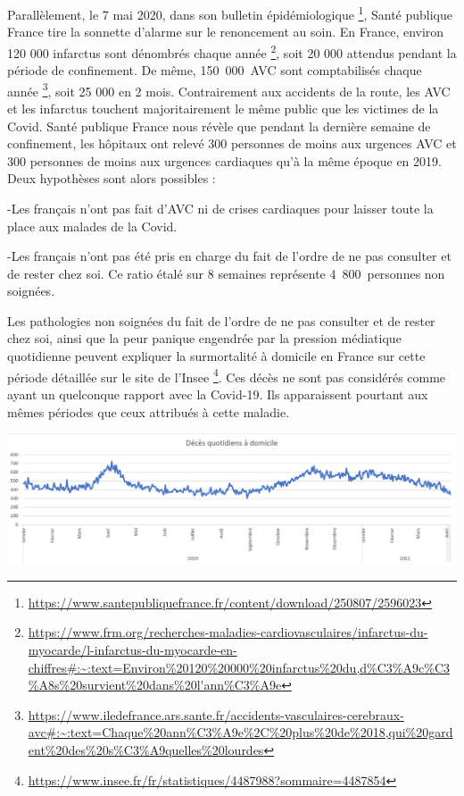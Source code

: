 \documentclass[
]{article}
\begin{document}
Parallèlement, le 7 mai 2020, dans son bulletin épidémiologique
\footnote{\url{https://www.santepubliquefrance.fr/content/download/250807/2596023}},
Santé publique France tire la sonnette d'alarme sur le renoncement au
soin. En France, environ 120 000 infarctus sont dénombrés chaque année
\footnote{\url{https://www.frm.org/recherches-maladies-cardiovasculaires/infarctus-du-myocarde/l-infarctus-du-myocarde-en-chiffres\#:~:text=Environ\%20120\%20000\%20infarctus\%20du,d\%C3\%A9c\%C3\%A8s\%20survient\%20dans\%20l'ann\%C3\%A9e}},
soit 20 000 attendus pendant la période de confinement. De même,
150~000~AVC sont comptabilisés chaque année \footnote{\url{https://www.iledefrance.ars.sante.fr/accidents-vasculaires-cerebraux-avc\#:~:text=Chaque\%20ann\%C3\%A9e\%2C\%20plus\%20de\%2018,qui\%20gardent\%20des\%20s\%C3\%A9quelles\%20lourdes}},
soit 25 000 en 2 mois. Contrairement aux accidents de la route, les AVC
et les infarctus touchent majoritairement le même public que les
victimes de la Covid. Santé publique France nous révèle que pendant la
dernière semaine de confinement, les hôpitaux ont relevé 300 personnes
de moins aux urgences AVC et 300 personnes de moins aux urgences
cardiaques qu'à la même époque en 2019. Deux hypothèses sont alors
possibles :

-Les français n'ont pas fait d'AVC ni de crises cardiaques pour laisser
toute la place aux malades de la Covid.

-Les français n'ont pas été pris en charge du fait de l'ordre de ne pas
consulter et de rester chez soi. Ce ratio étalé sur 8 semaines
représente 4~800~personnes non soignées.

Les pathologies non soignées du fait de l'ordre de ne pas consulter et
de rester chez soi, ainsi que la peur panique engendrée par la pression
médiatique quotidienne peuvent expliquer la surmortalité à domicile en
France sur cette période détaillée sur le site de l'Insee \footnote{\url{https://www.insee.fr/fr/statistiques/4487988?sommaire=4487854}}.
Ces décès ne sont pas considérés comme ayant un quelconque rapport avec
la Covid-19. Ils apparaissent pourtant aux mêmes périodes que ceux
attribués à cette maladie.

\includegraphics[width=10.41667in,height=\textheight]{data/images/domicile.png}
\end{document}
